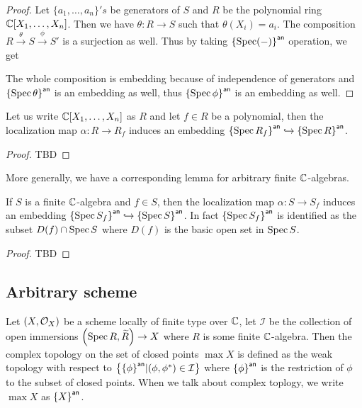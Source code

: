 \begin{proof}
  Let $\{a_{1},\dots, a_{n}\}'s$ be generators of $S$ and $R$ be the polynomial ring $\mathbb{C}[X_{1},\dots, X_{n}]$. Then we have $\theta : R \to S$ such that $\theta(X_{i})=a_{i}$. The composition $R \stackrel{\theta}{\to} S \stackrel{\phi}{\to} S'$ is a surjection as well. Thus by taking ${\left\{{\operatorname{Spec}(-)}\right\}}^{\mathsf{an}}$ operation, we get
  \begin{center}
  \end{center}
  The whole composition is embedding because of independence of generators and ${\left\{{\operatorname{Spec}{\theta}}\right\}}^{\mathsf{an}}$ is an embedding as well, thus ${\left\{{\operatorname{Spec}{\phi}}\right\}}^{\mathsf{an}}$ is an embedding as well.
\end{proof}

\begin{lemma}
  Let us write $\mathbb{C}[X_{1},\dots,X_{n}]$ as $R$ and let $f \in R$ be a polynomial, then the localization map $\alpha : R \to R_{f}$ induces an embedding ${\left\{{\operatorname{Spec}{R_{f}}}\right\}}^{\mathsf{an}} \hookrightarrow {\left\{{\ensuremath{\operatorname{Spec}}{R}}\right\}}^{\mathsf{an}}$.
\end{lemma}
\begin{proof}
TBD
\end{proof}

More generally, we have a corresponding lemma for arbitrary finite $\mathbb{C}$-algebras.

\begin{lemma}
  If $S$ is a finite $\mathbb{C}$-algebra and $f \in S$, then the localization map $\alpha : S \to S_{f}$ induces an embedding ${\left\{{\operatorname{Spec}{S_{f}}}\right\}}^{\mathsf{an}} \hookrightarrow {\left\{{\ensuremath{\operatorname{Spec}}{S}}\right\}}^{\mathsf{an}}$. In fact ${\left\{{\operatorname{Spec}{S_{f}}}\right\}}^{\mathsf{an}}$ is identified as the subset $D(f) \cap \operatorname{Spec}{S}$ where $D(f)$ is the basic open set in $\operatorname{Spec}{S}$.
\end{lemma}

\begin{proof}
TBD
\end{proof}

\subsection{Arbitrary scheme}

\begin{definition}
 Let $\left(X, \mathcal{O}_{X}\right)$ be a scheme locally of finite type over $\mathbb{C}$, let $\mathcal{I}$ be the collection of open immersions $\left(\operatorname*{Spec}{R}, \widetilde{R}\right) \to X$ where $R$ is some finite $\mathbb{C}$-algebra. Then the complex topology on the set of closed points $\max X$ is defined as the weak topology with respect to $\left\{{\left\{{{\phi}}\right\}}^{\mathsf{an}} | (\phi, \phi^{*}) \in \mathcal{I}\right\}$ where ${\left\{{\phi}\right\}}^{\mathsf{an}}$ is the restriction of $\phi$ to the subset of closed points. When we talk about complex toplogy, we write $\max{X}$ as ${\left\{{X}\right\}}^{\mathsf{an}}$.
\end{definition}

